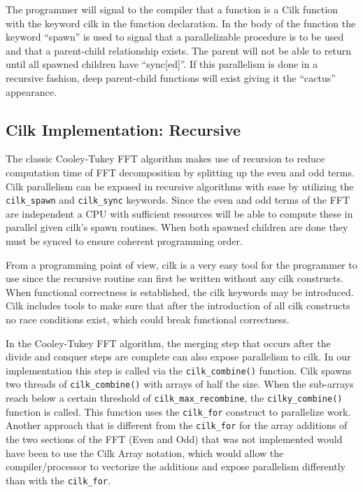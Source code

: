 The programmer will signal to the compiler that a function is a Cilk function with the keyword cilk in the function declaration. In the body of the function the keyword “spawn” is used to signal that a parallelizable procedure is to be used and that a parent-child relationship exists. The parent will not be able to return until all spawned children have “sync[ed]”. If this parallelism is done in a recursive fashion, deep parent-child functions will exist giving it the “cactus” appearance.


\subsection{Cilk Implementation: Recursive}

The classic Cooley-Tukey FFT algorithm makes use of recursion to reduce computation time of FFT decomposition by splitting up the even and odd terms. Cilk parallelism can be exposed in recursive algorithms with ease by utilizing the \texttt{cilk\_spawn} and \texttt{cilk\_sync} keywords. Since the even and odd terms of the FFT are independent a CPU with sufficient resources will be able to compute these in parallel given cilk’s spawn routines. When both spawned children are done they must be synced to ensure coherent programming order.

From a programming point of view, cilk is a very easy tool for the programmer to use since the recursive routine can first be written without any cilk constructs. When functional correctness is established, the cilk keywords may be introduced. Cilk includes tools to make sure that after the introduction of all cilk constructs no race conditions exist, which could break functional correctness.

In the Cooley-Tukey FFT algorithm, the merging step that occurs after the divide and conquer steps are complete can also expose parallelism to cilk. In our implementation this step is called via the \texttt{cilk\_combine()} function. Cilk spawns two threads of \texttt{cilk\_combine()} with arrays of half the size. When the sub-arrays reach below a certain threshold of \texttt{cilk\_max\_recombine}, the \texttt{cilky\_combine()} function is called. This function uses the \texttt{cilk\_for} construct to parallelize work. Another approach that is different from the \texttt{cilk\_for} for the array additions of the two sections of the FFT (Even and Odd) that was not implemented would have been to use the Cilk Array notation, which would allow the compiler/processor to vectorize the additions and expose parallelism differently than with the \texttt{cilk\_for}. 

